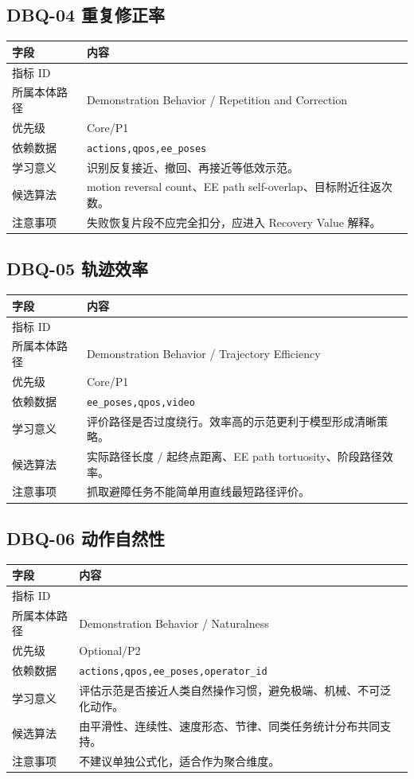 \documentclass[UTF8,zihao=-4,oneside,openany]{ctexrep}
\newcommand{\Code}[1]{\texttt{#1}}
\newcommand{\MID}[1]{\texttt{\seqsplit{#1}}}
\begin{document}
\subsection{DBQ-04 重复修正率}

\begin{longtable}{L{3.6cm} L{9.6cm}}
\toprule
字段 & 内容 \\
\midrule
指标 ID & \MID{DBQ-04} \\
所属本体路径 & Demonstration Behavior / Repetition and Correction \\
优先级 & Core/P1 \\
依赖数据 & \Code{actions,qpos,ee\_poses} \\
学习意义 & 识别反复接近、撤回、再接近等低效示范。 \\
候选算法 & motion reversal count、EE path self-overlap、目标附近往返次数。 \\
注意事项 & 失败恢复片段不应完全扣分，应进入 Recovery Value 解释。 \\
\bottomrule
\end{longtable}

\subsection{DBQ-05 轨迹效率}

\begin{longtable}{L{3.6cm} L{9.6cm}}
\toprule
字段 & 内容 \\
\midrule
指标 ID & \MID{DBQ-05} \\
所属本体路径 & Demonstration Behavior / Trajectory Efficiency \\
优先级 & Core/P1 \\
依赖数据 & \Code{ee\_poses,qpos,video} \\
学习意义 & 评价路径是否过度绕行。效率高的示范更利于模型形成清晰策略。 \\
候选算法 & 实际路径长度 / 起终点距离、EE path tortuosity、阶段路径效率。 \\
注意事项 & 抓取避障任务不能简单用直线最短路径评价。 \\
\bottomrule
\end{longtable}

\subsection{DBQ-06 动作自然性}

\begin{longtable}{L{3.6cm} L{9.6cm}}
\toprule
字段 & 内容 \\
\midrule
指标 ID & \MID{DBQ-06} \\
所属本体路径 & Demonstration Behavior / Naturalness \\
优先级 & Optional/P2 \\
依赖数据 & \Code{actions,qpos,ee\_poses,operator\_id} \\
学习意义 & 评估示范是否接近人类自然操作习惯，避免极端、机械、不可泛化动作。 \\
候选算法 & 由平滑性、连续性、速度形态、节律、同类任务统计分布共同支持。 \\
注意事项 & 不建议单独公式化，适合作为聚合维度。 \\
\bottomrule
\end{longtable}
\end{document}

